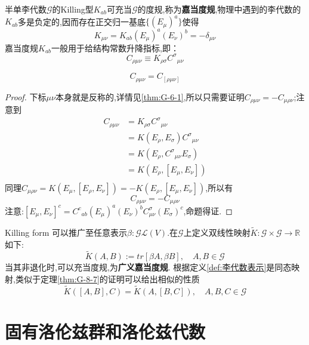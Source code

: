 \documentclass[../main.tex]{subfiles}
\begin{document}
半单李代数$\mathscr{G}$的Killing型$K_{ab}$可充当$\mathscr{G}$的度规,称为\textbf{嘉当度规},物理中遇到的李代数的$K_{ab}$多是负定的,因而存在正交归一基底$\{(E_\mu)^a\}$使得$$
	K_{\mu\nu} = K_{ab} (E_\mu)^a(E_\nu)^b = -\delta_{\mu\nu}$$
嘉当度规$K_{ab}$一般用于给结构常数升降指标,即：
$$
	C_{\rho\mu\nu} \equiv K_{\rho\sigma}C^{\sigma}{}_{\mu \nu}
$$
\begin{theorem}
	$$
		C_{\rho \mu \nu} = C_{[\rho \mu \nu]}$$

\end{theorem}
\begin{proof}
	下标$\mu\nu$本身就是反称的,详情见\ref{thm:G-6-1},所以只需要证明$C_{\rho \mu \nu} = - C_{\mu\rho \nu}$;注意到
	\begin{align*}
		C_{\rho \mu \nu} & = K_{\rho\sigma}C^\sigma{}_{\mu\nu}      \\
		                 & = K(E_\rho ,E_\sigma)C^\sigma{}_{\mu\nu} \\
		                 & = K(E_\rho, C^\sigma{}_{\mu\nu}E_\sigma) \\
		                 & = K(E_\rho, [E_\mu,E_\nu])               \\
	\end{align*}
	同理$C_{\mu\rho\nu} = K(E_\mu,[E_\rho,E_\nu]) = -K(E_\rho,[E_\mu,E_\nu])$,所以有$$
		C_{\rho \mu \nu} = -C_{\mu\rho\nu}
	$$
	注意:$[E_\mu,E_\nu]^c = C^c{}_{ab} (E_\mu)^a (E_\nu)^b C^\sigma_{\mu\nu} (E_\sigma)^c$,命题得证.
\end{proof}

Killing form 可以推广至任意表示$\beta: \mathscr{G}\mathscr{L}(V) $.在$\mathscr{G}$上定义双线性映射$\tilde{K}:\mathscr{G}\times \mathscr{G} \rightarrow \mathbb{R}$如下:$$
	\tilde{K}(A,B) := tr[\beta{A},\beta{B}],\quad A,B \in \mathscr{G}$$当其非退化时,可以充当度规,为\textbf{广义嘉当度规}.
根据定义\ref{def:李代数表示}是同态映射,类似于定理\ref{thm:G-8-7}的证明可以给出相似的性质$$
	\tilde{K} ([A,B],C) = \tilde{K}(A,[B,C]), \quad A,B,C \in \mathscr{G}$$
\chapter{固有洛伦兹群和洛伦兹代数}
\end{document}
